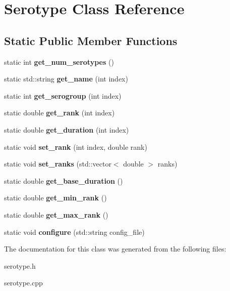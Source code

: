 \hypertarget{class_serotype}{}\section{Serotype Class Reference}
\label{class_serotype}
\subsection*{Static Public Member Functions}
\begin{DoxyCompactItemize}
\item 
\mbox{\label{class_serotype_a94503aaec8f8b1886bc81c569597a4ef}} 
static int {\bfseries get\+\_\+num\+\_\+serotypes} ()
\item 
\mbox{\label{class_serotype_a85c630d7deb49f1f691c9ad431bd89ac}} 
static std\+::string {\bfseries get\+\_\+name} (int index)
\item 
\mbox{\label{class_serotype_a72fda8312e8d25b48b39bc3d7495f7ee}} 
static int {\bfseries get\+\_\+serogroup} (int index)
\item 
\mbox{\label{class_serotype_aa8eee45e29d1ab561c28bb9278ce31bc}} 
static double {\bfseries get\+\_\+rank} (int index)
\item 
\mbox{\label{class_serotype_aa385eecbfc3754303ee112b2abe279cc}} 
static double {\bfseries get\+\_\+duration} (int index)
\item 
\mbox{\label{class_serotype_a87da79414a9663ff9fa88d3444d739e4}} 
static void {\bfseries set\+\_\+rank} (int index, double rank)
\item 
\mbox{\label{class_serotype_ae837fbc7a15cb11a636ce1fee8d4f08b}} 
static void {\bfseries set\+\_\+ranks} (std\+::vector$<$ double $>$ ranks)
\item 
\mbox{\label{class_serotype_ace395bf9293f752bfb3091449d08c0ab}} 
static double {\bfseries get\+\_\+base\+\_\+duration} ()
\item 
\mbox{\label{class_serotype_a75c6f658a74c2a28875f5e871a1089f5}} 
static double {\bfseries get\+\_\+min\+\_\+rank} ()
\item 
\mbox{\label{class_serotype_a71dbab6b7f7e514faf7825d11373c3ec}} 
static double {\bfseries get\+\_\+max\+\_\+rank} ()
\item 
\mbox{\label{class_serotype_a6b41a01ce55cbb0317f135c16a6bb44f}} 
static void {\bfseries configure} (std\+::string config\+\_\+file)
\end{DoxyCompactItemize}


The documentation for this class was generated from the following files\+:\begin{DoxyCompactItemize}
\item 
serotype.\+h\item 
serotype.\+cpp\end{DoxyCompactItemize}

